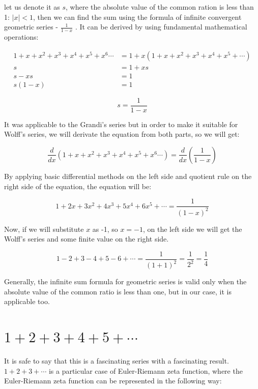 \documentclass[a4paper]{article}
\begin{document}
let us denote it as \(s\),
where the absolute value of the common ration is less than 1: \(|x| < 1\), then we
can find the sum using the formula of infinite convergent geometric series -
\(\frac{1}{1-x}\) . It can be derived by using fundamental mathematical
operations: 

\begin{align*}
  1+x+x^2+x^3+x^4+x^5+x^6\cdots&=1+x(1+x+x^2+x^3+x^4+x^5+\cdots)\\
  s&=1+xs\\
  s-xs&=1\\
  s(1-x)&=1
\end{align*}

\begin{equation}
  s=\frac{1}{1-x}
  \end{equation}

It was applicable to the Grandi's series but in order to make it suitable for
Wolff's series, we will derivate the equation from both parts, so we will get: 

\begin{equation*}
  \frac{d}{dx}(1+x+x^2+x^3+x^4+x^5+x^6\cdots)=\frac{d}{dx}(\frac{1}{1-x})
  \end{equation*}

By applying basic differential methods on the left side and quotient rule on the
right side of the equation, the equation will be:

\begin{equation*}
  1+2x+3x^2+4x^3+5x^4+6x^5+\cdots=\frac{1}{(1-x)^2}
  \end{equation*}

Now, if we will substitute \(x\) as -1, so \(x=-1\), on the left side we will get
the Wolff's series and some finite value on the right side.

\begin{equation}
  1-2+3-4+5-6+\cdots=\frac{1}{(1+1)^2}=\frac{1}{2^2}=\frac{1}{4}
  \label{Wolff}
\end{equation}

Generally, the infinite sum formula for geometric series is valid only when the
absolute value of the common ratio is less than one, but in our case, it is
applicable too. 

\section{\(1+2+3+4+5+\cdots\)}
\label{sec:orgb3f31a0}

It is safe to say that this is a fascinating series with a fascinating
result. \(1+2+3+\cdots\) is a particular case of Euler-Riemann zeta function, where
the Euler-Riemann zeta function can be represented in the following way:
\end{document}
